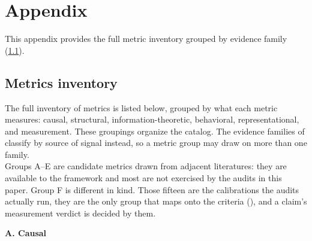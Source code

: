 \documentclass{article}
\begin{document}


\nocite{campbell1963experimental}



\clearpage
\appendix
\section{Appendix}

This appendix provides the full metric inventory grouped by evidence family (\ref{appendix:metrics}).

\subsection{Metrics inventory}
\label{appendix:metrics}
The full inventory of metrics is listed below, grouped by what each metric measures: causal, structural, information-theoretic, behavioral, representational, and measurement. These groupings organize the catalog. The evidence families of  classify by source of signal instead, so a metric group may draw on more than one family. \\
Groups A--E are candidate metrics drawn from adjacent literatures: they are available to the framework and most are not exercised by the audits in this paper.  Group F is different in kind.  Those fifteen are the calibrations the audits actually run, they are the only group that maps onto the criteria (), and a claim's measurement verdict is decided by them.
\\
\begingroup
\small
\setlength{\tabcolsep}{4pt}
\renewcommand{\arraystretch}{1.15}


\begingroup
\small
\setlength{\tabcolsep}{4pt}
\renewcommand{\arraystretch}{1.15}
\noindent\textbf{A. Causal}\par
\vspace{4pt}\noindent{}
\nopagebreak
\end{document}
